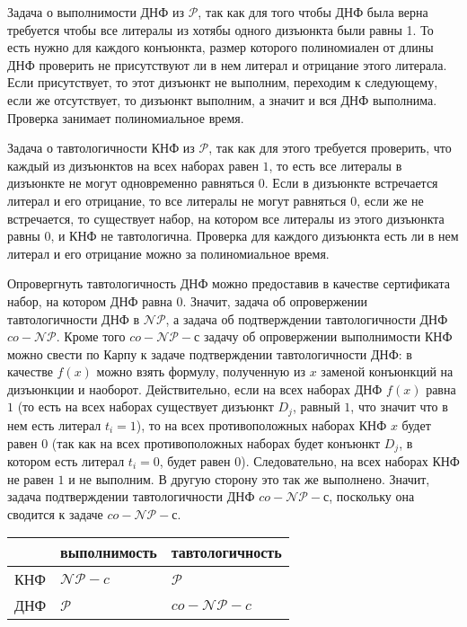 \documentclass[a4paper,12pt]{article} %
\begin{document}
Задача о выполнимости ДНФ из $\mathcal{P}$, так как для того чтобы ДНФ была верна требуется чтобы все литералы из хотябы одного дизъюнкта были равны 1. То есть нужно для каждого конъюнкта, размер которого полиномиален от длины ДНФ проверить не присутствуют ли в нем литерал и отрицание этого литерала. Если присутствует, то этот дизъюнкт не выполним, переходим к следующему, если же отсутствует, то дизъюнкт выполним, а значит и вся ДНФ выполнима. Проверка занимает полиномиальное время.

Задача о тавтологичности КНФ из $\mathcal{P}$, так как для этого требуется проверить, что каждый из дизъюнктов на всех наборах равен $1$, то есть все литералы в дизъюнкте не могут одновременно равняться $0$. Если в дизъюнкте встречается литерал и его отрицание, то все литералы не могут равняться $0$, если же не встречается, то существует набор, на котором все литералы из этого дизъюнкта равны $0$, и КНФ не тавтологична. Проверка для каждого дизъюнкта есть ли в нем литерал и его отрицание можно за полиномиальное время.

Опровергнуть тавтологичность ДНФ можно предоставив в качестве сертификата набор, на котором ДНФ равна $0$. Значит, задача об опровержении тавтологичности ДНФ в $\mathcal{NP}$, а задача об подтверждении тавтологичности ДНФ $co-\mathcal{NP}$. Кроме того $co-\mathcal{NP}-с$ задачу об опровержении выполнимости КНФ можно свести по Карпу к задаче подтверждении тавтологичности ДНФ: в качестве $f(x)$ можно взять формулу, полученную из $x$ заменой конъюнкций на дизъюнкции и наоборот. Действительно, если на всех наборах ДНФ $f(x)$ равна $1$ (то есть на всех наборах существует дизъюнкт $D_j$, равный $1$, что значит что в нем есть литерал $t_i=1$), то на всех противоположных наборах КНФ $x$ будет равен $0$ (так как на всех противоположных наборах будет конъюнкт $D_j$, в котором есть литерал $t_i=0$, будет равен $0$). Следовательно, на всех наборах КНФ не равен $1$ и не выполним. В другую сторону это так же выполнено. Значит, задача подтверждении тавтологичности ДНФ $co-\mathcal{NP}-с$, поскольку она сводится к задаче $co-\mathcal{NP}-с$.


\begin{table}[]
	\begin{tabular}{|l|l|l|}
		\hline
		& выполнимость & тавтологичность \\ \hline
		КНФ & $\mathcal{NP}-c$          & $\mathcal{P}$               \\ \hline
		ДНФ & $\mathcal{P}$            & $co-\mathcal{NP}-c$          \\ \hline
	\end{tabular}
\end{table}
\end{document}
